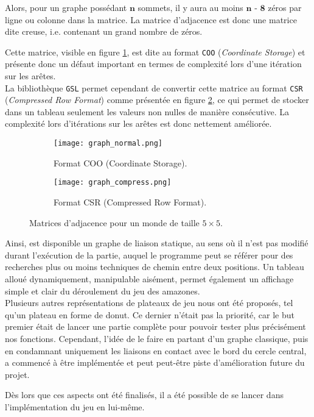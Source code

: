 Alors, pour un graphe possédant $\textbf{n}$ sommets, il y aura au moins $\textbf{n - 8}$ zéros par ligne ou colonne dans la matrice. La matrice d'adjacence est donc une matrice dite creuse, i.e. contenant un grand nombre de zéros.

\medbreak
Cette matrice, visible en figure \ref{subfig:graphe_normal}, est dite au format \texttt{COO} (\textit{Coordinate Storage}) et présente donc un défaut important en termes de complexité lors d'une itération sur les arêtes. \\
La bibliothèque \texttt{GSL} permet cependant de convertir cette matrice au format \texttt{CSR} (\textit{Compressed Row Format}) comme présentée en figure \ref{subfig:graphe_compresse}, ce qui permet de stocker dans un tableau seulement les valeurs non nulles de manière consécutive. La complexité lors d'itérations sur les arêtes est donc nettement améliorée.

\begin{figure}[H]
    \centering
    \begin{subfigure}{0.5\textwidth}
        \centering
        \texttt{[image: graph\_normal.png]}
        \caption{Format COO (Coordinate Storage).}
        \label{subfig:graphe_normal}
    \end{subfigure}
    \hspace{1cm}
    \begin{subfigure}{0.4\textwidth}
        \centering
        \texttt{[image: graph\_compress.png]}
        \caption{Format CSR (Compressed Row Format).}
        \label{subfig:graphe_compresse}
    \end{subfigure}
    \caption{Matrices d'adjacence pour un monde de taille $5\times5$.\protect\footnotemark} 
    \label{fig:matrices_d_adjacence}
\end{figure} \medbreak
{}

Ainsi, est disponible un graphe de liaison statique, au sens où il n'est pas modifié durant l'exécution de la partie, auquel le programme peut se référer pour des recherches plus ou moins techniques de chemin entre deux positions. Un tableau alloué dynamiquement, manipulable aisément, permet également un affichage simple et clair du déroulement du jeu des amazones.\\
Plusieurs autres représentations de plateaux de jeu nous ont été proposés, tel qu'un plateau en forme de donut. Ce dernier n'était pas la priorité, car le but premier était de lancer une partie complète pour pouvoir tester plus précisément nos fonctions. Cependant, l'idée de le faire en partant d'un graphe classique, puis en condamnant uniquement les liaisons en contact avec le bord du cercle central, a commencé à être implémentée et peut peut-être piste d'amélioration future du projet.

\medbreak

Dès lors que ces aspects ont été finalisés, il a été possible de se lancer dans l'implémentation du jeu en lui-même.
